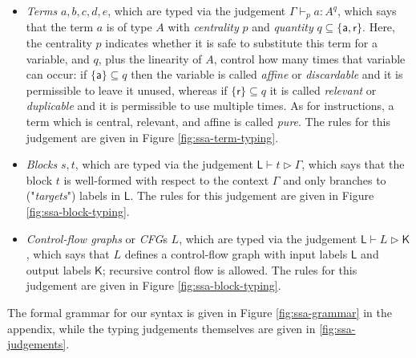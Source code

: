 \documentclass[acmsmall,screen,review]{acmart}
\newcommand{\ms}[1]{\ensuremath{\mathsf{#1}}}
\newcommand{\taff}{{\{\ms{a}\}}}
\newcommand{\trel}{{\{\ms{r}\}}}
\newcommand{\hasty}[5]{#1 \vdash_{#2} #3: {#4}^{#5}}
\newcommand{\haslb}[3]{#1 \vdash #2 \rhd #3}
\newcommand{\lhaslb}[3]{#1 \vdash #2 \rhd #3}
\begin{document}
\begin{itemize}
  \item \textit{Terms} \(a, b, c, d, e\), which are typed via the judgement
  \(\hasty{\Gamma}{p}{a}{A}{q}\), which says that the term \(a\) is of type
  \(A\) with \textit{centrality} \(p\) and \textit{quantity} \(q \subseteq
  \{\ms{a}, \ms{r}\}\). Here, the centrality \(p\) indicates whether it is safe
  to substitute this term for a variable, and \(q\), plus the linearity of
  \(A\), control how many times that variable can occur: if \(\taff \subseteq
  q\) then the variable is called \textit{affine} or \textit{discardable} and it
  is permissible to leave it unused, whereas if \(\trel \subseteq q\) it is
  called \textit{relevant} or \textit{duplicable} and it is permissible to use
  multiple times. As for instructions, a term which is central, relevant, and
  affine is called \textit{pure}. The rules for this judgement are given in
  Figure \ref{fig:ssa-term-typing}.
  
  \item \textit{Blocks} \(s, t\), which are typed via the judgement
  \(\haslb{\ms{L}}{t}{\Gamma}\), which says that the block \(t\) is well-formed
  with respect to the context \(\Gamma\) and only branches to
  ("\textit{targets}") labels in \(\ms{L}\). The rules for this judgement are
  given in Figure \ref{fig:ssa-block-typing}.

\item \textit{Control-flow graphs} or \textit{CFG}s \(L\), which are typed via
  the judgement \(\lhaslb{\ms{L}}{L}{\ms{K}}\), which says that \(L\) defines a
  control-flow graph with input labels \(\ms{L}\) and output labels \(\ms{K}\);
  recursive control flow is allowed. The rules for this judgement are given in
  Figure \ref{fig:ssa-block-typing}.
\end{itemize}
The formal grammar for our syntax is given in Figure \ref{fig:ssa-grammar} in
the appendix, while the typing judgements themselves are given in
\ref{fig:ssa-judgements}. 
\end{document}
